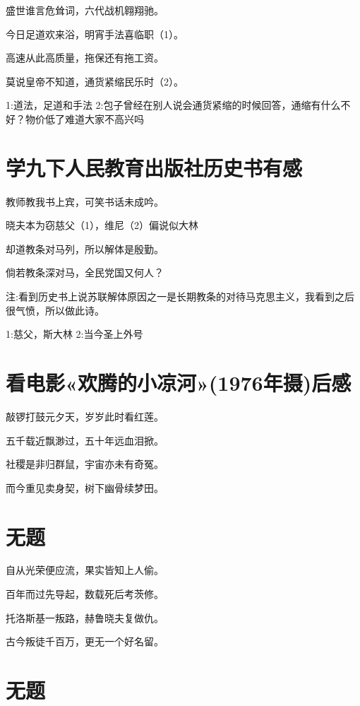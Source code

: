 \documentclass[
]{article}
\begin{document}
盛世谁言危耸词，六代战机翱翔驰。

今日足道欢来浴，明宵手法喜临职（1）。

高速从此高质量，拖保还有拖工资。

莫说皇帝不知道，通货紧缩民乐时（2）。

1:道法，足道和手法
2:包子曾经在别人说会通货紧缩的时候回答，通缩有什么不好？物价低了难道大家不高兴吗

\section{学九下人民教育出版社历史书有感}\label{ux5b66ux4e5dux4e0bux4ebaux6c11ux6559ux80b2ux51faux7248ux793eux5386ux53f2ux4e66ux6709ux611f}

教师教我书上宾，可笑书话未成吟。

晓夫本为窃慈父（1），维尼（2）偏说似大林

却道教条对马列，所以解体是殷勤。

倘若教条深对马，全民党国又何人？

注:看到历史书上说苏联解体原因之一是长期教条的对待马克思主义，我看到之后很气愤，所以做此诗。

1:慈父，斯大林 2:当今圣上外号

\section{看电影«欢腾的小凉河»(1976年摄)后感}\label{ux770bux7535ux5f71ux6b22ux817eux7684ux5c0fux51c9ux6cb31976ux5e74ux6444ux540eux611f}

敲锣打鼓元夕天，岁岁此时看红莲。

五千载近飘渺过，五十年远血泪掀。

社稷是非归群鼠，宇宙亦未有奇冤。

而今重见卖身契，树下幽骨续梦田。

\section{无题}\label{ux65e0ux9898-2}

自从光荣便应流，果实皆知上人偷。

百年而过先导起，数载死后考茨修。

托洛斯基一叛路，赫鲁晓夫复做仇。

古今叛徒千百万，更无一个好名留。

\section{无题}\label{ux65e0ux9898-3}
\end{document}
